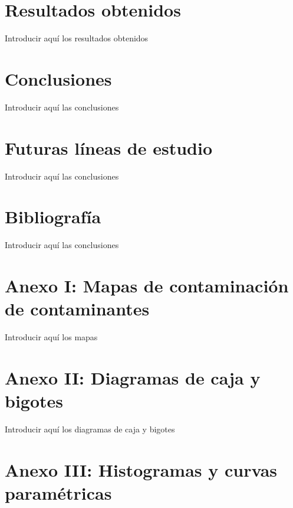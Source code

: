 \documentclass[12pt]{article}
\begin{document}
\section{Resultados obtenidos}

Introducir aquí los resultados obtenidos

\newpage

\section{Conclusiones}

Introducir aquí las conclusiones

\newpage

\section{Futuras líneas de estudio}

Introducir aquí las conclusiones

\newpage

\section{Bibliografía}

Introducir aquí las conclusiones

\newpage


\section*{Anexo I: Mapas de contaminación de contaminantes}
%

Introducir aquí los mapas

\newpage

\section*{Anexo II: Diagramas de caja y bigotes}
%

Introducir aquí los diagramas de caja y bigotes

\newpage

\section*{Anexo III: Histogramas y curvas paramétricas}
%
\end{document}
